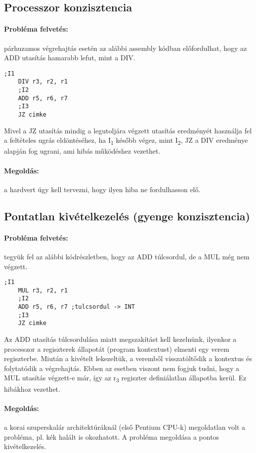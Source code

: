 \subsection{Processzor konzisztencia}
\paragraph{Probléma felvetés:} párhuzamos végrehajtás esetén az alábbi assembly kódban előfordulhat, hogy az ADD utasítás hamarabb lefut, mint a DIV.
\begin{lstlisting}[language=Ant]
    ;I1
    DIV r3, r2, r1
    ;I2
    ADD r5, r6, r7
    ;I3
    JZ cimke
\end{lstlisting}
Mivel a JZ utasítás mindig a legutoljára végzett utasítás eredményét használja fel a feltételes ugrás eldöntéséhez,
ha I\textsubscript{1} később végez, mint I\textsubscript{2}, JZ a DIV eredménye alapján fog ugrani, ami hibás működéshez vezethet.
\paragraph{Megoldás:} a hardvert úgy kell tervezni, hogy ilyen hiba ne fordulhasson elő.

\subsection{Pontatlan kivételkezelés (gyenge konzisztencia)}
\paragraph{Probléma felvetés:} tegyük fel az alábbi kódrészletben, hogy az ADD túlcsordul, de a MUL még nem végzett.
\begin{lstlisting}[language=Ant]
    ;I1
    MUL r3, r2, r1
    ;I2
    ADD r5, r6, r7 ;tulcsordul -> INT
    ;I3
    JZ cimke
\end{lstlisting}
Az ADD utasítás túlcsordulása miatt megszakítást kell kezelnünk, ilyenkor a processzor a regiszterek állapotát (program kontextust) elmenti egy verem regiszterbe.
Miután a kivételt lekezeltük, a veremből visszatöltődik a kontextus és folytatódik a végrehajtás.
Ebben az esetben viszont nem fogjuk tudni, hogy a MUL utasítás végzett-e már, így az r\textsubscript{3} regiszter definiálatlan állapotba kerül.
Ez hibákhoz vezethet.
\paragraph{Megoldás:} a korai szuperskalár architektúráknál (első Pentium CPU-k) megoldatlan volt a probléma, pl. kék halált is okozhatott.
A probléma megoldása a pontos kivételkezelés.


